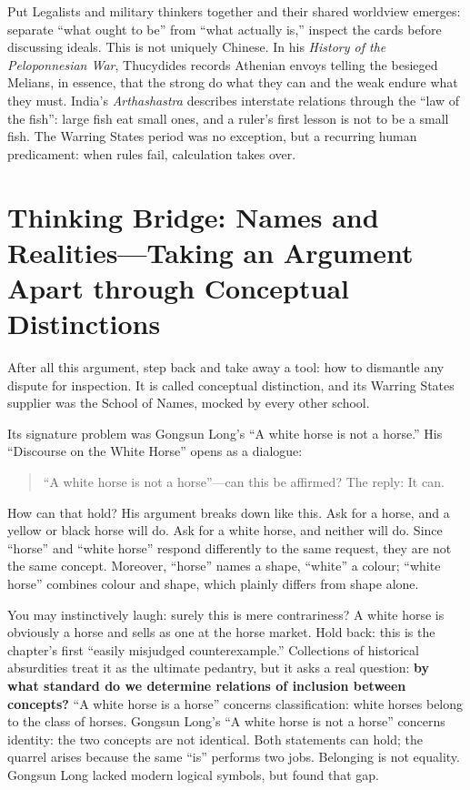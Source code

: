 Put Legalists and military thinkers together and their shared worldview emerges: separate ``what ought to be'' from ``what actually is,'' inspect the cards before discussing ideals. This is not uniquely Chinese. In his \textit{History of the Peloponnesian War}, Thucydides records Athenian envoys telling the besieged Melians, in essence, that the strong do what they can and the weak endure what they must. India's \textit{Arthashastra} describes interstate relations through the ``law of the fish'': large fish eat small ones, and a ruler's first lesson is not to be a small fish. The Warring States period was no exception, but a recurring human predicament: when rules fail, calculation takes over.

\section[Thinking Bridge: Distinguish Concepts]{Thinking Bridge: Names and Realities---Taking an Argument Apart through Conceptual Distinctions}
After all this argument, step back and take away a tool: how to dismantle any dispute for inspection. It is called conceptual distinction, and its Warring States supplier was the School of Names, mocked by every other school.

Its signature problem was Gongsun Long's ``A white horse is not a horse.'' His ``Discourse on the White Horse'' opens as a dialogue:

\begin{quote}
``A white horse is not a horse''---can this be affirmed? The reply: It can.
\end{quote}
How can that hold? His argument breaks down like this. Ask for a horse, and a yellow or black horse will do. Ask for a white horse, and neither will do. Since ``horse'' and ``white horse'' respond differently to the same request, they are not the same concept. Moreover, ``horse'' names a shape, ``white'' a colour; ``white horse'' combines colour and shape, which plainly differs from shape alone.

You may instinctively laugh: surely this is mere contrariness? A white horse is obviously a horse and sells as one at the horse market. Hold back: this is the chapter's first ``easily misjudged counterexample.'' Collections of historical absurdities treat it as the ultimate pedantry, but it asks a real question: \textbf{by what standard do we determine relations of inclusion between concepts?} ``A white horse is a horse'' concerns classification: white horses belong to the class of horses. Gongsun Long's ``A white horse is not a horse'' concerns identity: the two concepts are not identical. Both statements can hold; the quarrel arises because the same ``is'' performs two jobs. Belonging is not equality. Gongsun Long lacked modern logical symbols, but found that gap.

